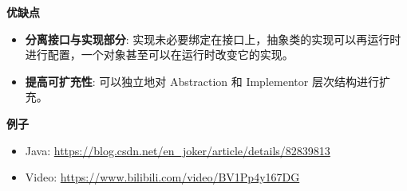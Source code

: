 \noindent\textbf{优缺点}

\begin{itemize}
    \item \textbf{分离接口与实现部分}: 实现未必要绑定在接口上，抽象类的实现可以再运行时进行配置，一个对象甚至可以在运行时改变它的实现。
    \item \textbf{提高可扩充性}: 可以独立地对 Abstraction 和 Implementor 层次结构进行扩充。
\end{itemize}

\noindent\textbf{例子}

\begin{itemize}
    \item Java: \url{https://blog.csdn.net/en_joker/article/details/82839813}
    \item Video: \url{https://www.bilibili.com/video/BV1Pp4y167DG}
\end{itemize}



\newpage